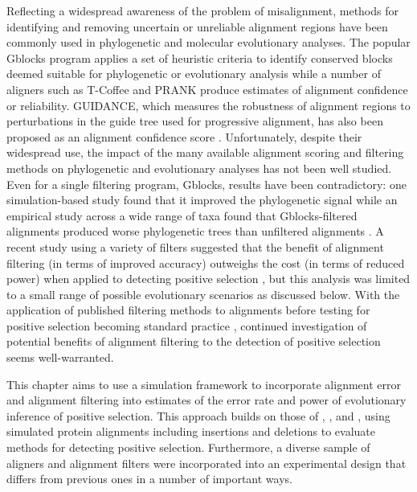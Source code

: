 Reflecting a widespread awareness of the problem of misalignment,
methods for identifying and removing uncertain or unreliable alignment
regions have been commonly used in phylogenetic and molecular
evolutionary analyses. The popular Gblocks program applies a set of
heuristic criteria to identify conserved blocks deemed suitable for
phylogenetic or evolutionary analysis \citep{Castresana2000Selection}
while a number of aligners such as T-Coffee
\citep{Notredame2000} and PRANK
\citep{Loytynoja2008PhylogenyAware} produce estimates of alignment
confidence or reliability. GUIDANCE, which measures the robustness of
alignment regions to perturbations in the guide tree used for
progressive alignment, has also been proposed as an alignment
confidence score \citep{Penn2010Alignment}. Unfortunately, despite
their widespread use, the impact of the many available alignment
scoring and filtering methods on phylogenetic and evolutionary
analyses has not been well studied. Even for a single filtering
program, Gblocks, results have been contradictory: one
simulation-based study found that it improved the phylogenetic signal
\citep{Talavera2007Improvement} while an empirical study across a wide
range of taxa found that Gblocks-filtered alignments produced worse
phylogenetic trees than unfiltered alignments
\citep{Dessimoz2010Phylogenetic}. A recent study using a variety of
filters suggested that the benefit of alignment filtering (in terms of
improved accuracy) outweighs the cost (in terms of reduced power) when
applied to detecting positive selection \citep{Privman2011Improving},
but this analysis was limited to a small range of possible
evolutionary scenarios as discussed below.  With the application of
published filtering methods to alignments before testing for positive
selection becoming standard practice
\citep{Studer2008,Aguileta2009Rapidly}, continued
investigation of potential benefits of alignment filtering to the
detection of positive selection seems well-warranted.

This chapter aims to use a simulation framework to incorporate
alignment error and alignment filtering into estimates of the error
rate and power of \sw evolutionary inference of positive
selection. This approach builds on those of \citet{Anisimova2002},
\citet{Fletcher2010}, and \citet{Privman2011Improving}, using
simulated protein alignments including insertions and deletions to
evaluate methods for detecting \sw positive selection. Furthermore, a
diverse sample of aligners and alignment filters were incorporated
into an experimental design that differs from previous ones in a
number of important ways.

